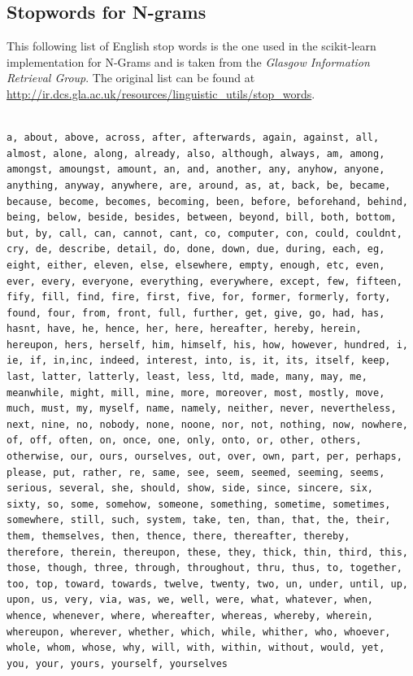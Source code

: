 \clearpage
\subsection{Stopwords for N-grams}
\label{sub:Stopwords for N-grams}


This following list of English stop words is the one used in the \gls{scikit-learn} implementation for N-Grams and is taken from the \emph{Glasgow Information Retrieval Group}. The original list can be found at \url{http://ir.dcs.gla.ac.uk/resources/linguistic_utils/stop_words}.

\begin{verbatim}

a, about, above, across, after, afterwards, again, against, all,
almost, alone, along, already, also, although, always, am, among,
amongst, amoungst, amount, an, and, another, any, anyhow, anyone,
anything, anyway, anywhere, are, around, as, at, back, be, became,
because, become, becomes, becoming, been, before, beforehand, behind,
being, below, beside, besides, between, beyond, bill, both, bottom,
but, by, call, can, cannot, cant, co, computer, con, could, couldnt,
cry, de, describe, detail, do, done, down, due, during, each, eg,
eight, either, eleven, else, elsewhere, empty, enough, etc, even,
ever, every, everyone, everything, everywhere, except, few, fifteen,
fify, fill, find, fire, first, five, for, former, formerly, forty,
found, four, from, front, full, further, get, give, go, had, has,
hasnt, have, he, hence, her, here, hereafter, hereby, herein,
hereupon, hers, herself, him, himself, his, how, however, hundred, i,
ie, if, in,inc, indeed, interest, into, is, it, its, itself, keep,
last, latter, latterly, least, less, ltd, made, many, may, me,
meanwhile, might, mill, mine, more, moreover, most, mostly, move,
much, must, my, myself, name, namely, neither, never, nevertheless,
next, nine, no, nobody, none, noone, nor, not, nothing, now, nowhere,
of, off, often, on, once, one, only, onto, or, other, others,
otherwise, our, ours, ourselves, out, over, own, part, per, perhaps,
please, put, rather, re, same, see, seem, seemed, seeming, seems,
serious, several, she, should, show, side, since, sincere, six,
sixty, so, some, somehow, someone, something, sometime, sometimes,
somewhere, still, such, system, take, ten, than, that, the, their,
them, themselves, then, thence, there, thereafter, thereby,
therefore, therein, thereupon, these, they, thick, thin, third, this,
those, though, three, through, throughout, thru, thus, to, together,
too, top, toward, towards, twelve, twenty, two, un, under, until, up,
upon, us, very, via, was, we, well, were, what, whatever, when,
whence, whenever, where, whereafter, whereas, whereby, wherein,
whereupon, wherever, whether, which, while, whither, who, whoever,
whole, whom, whose, why, will, with, within, without, would, yet,
you, your, yours, yourself, yourselves

\end{verbatim}

